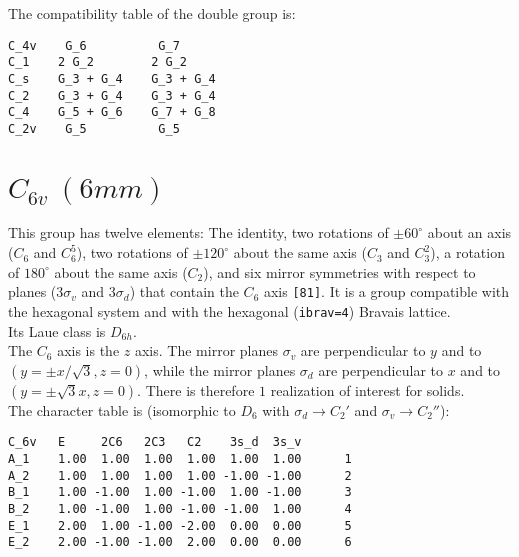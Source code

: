 \documentclass[12pt,a4paper,twoside]{report}
\begin{document}
The compatibility table of the double group is:

\begin{tcolorbox}
\begin{footnotesize}
\begin{verbatim}
C_4v    G_6          G_7  
C_1    2 G_2        2 G_2
C_s    G_3 + G_4    G_3 + G_4
C_2    G_3 + G_4    G_3 + G_4
C_4    G_5 + G_6    G_7 + G_8
C_2v    G_5          G_5
\end{verbatim}
\end{footnotesize}
\end{tcolorbox}


\newpage
{\color{coral}\section{$C_{6v}\ (6mm)$}} 
\color{black}
This group has twelve elements: The identity, two rotations of $\pm60^\circ$ 
about an axis ($C_6$ and $C_6^5$), two rotations of $\pm120^\circ$
about the same axis ($C_3$ and $C_3^2$), a rotation of $180^\circ$ about 
the same axis ($C_2$), and six mirror symmetries with respect to
planes ($3\sigma_v$ and $3\sigma_d$) that contain the $C_6$ axis \texttt{[81]}.
It is a group compatible with the hexagonal system and with the  
hexagonal (\texttt{ibrav=4}) Bravais lattice. \\ 
Its Laue class is $D_{6h}$. \\
The $C_6$ axis is the $z$ axis. The mirror planes $\sigma_v$ are perpendicular 
to $y$ and to $(y=\pm x/\sqrt{3}, z=0)$, while the mirror planes $\sigma_d$
are perpendicular to $x$ and to $(y=\pm \sqrt{3} x, z=0)$.
There is therefore $1$ realization of interest for solids. \\
The character table is (isomorphic to $D_6$ with $\sigma_d \rightarrow C_2'$
and $\sigma_v \rightarrow C_2''$):

\begin{tcolorbox}
\begin{footnotesize}
\begin{verbatim}
C_6v   E     2C6   2C3   C2    3s_d  3s_v 
A_1    1.00  1.00  1.00  1.00  1.00  1.00      1
A_2    1.00  1.00  1.00  1.00 -1.00 -1.00      2
B_1    1.00 -1.00  1.00 -1.00  1.00 -1.00      3
B_2    1.00 -1.00  1.00 -1.00 -1.00  1.00      4
E_1    2.00  1.00 -1.00 -2.00  0.00  0.00      5
E_2    2.00 -1.00 -1.00  2.00  0.00  0.00      6
\end{verbatim}
\end{footnotesize}
\end{tcolorbox}
\end{document}
